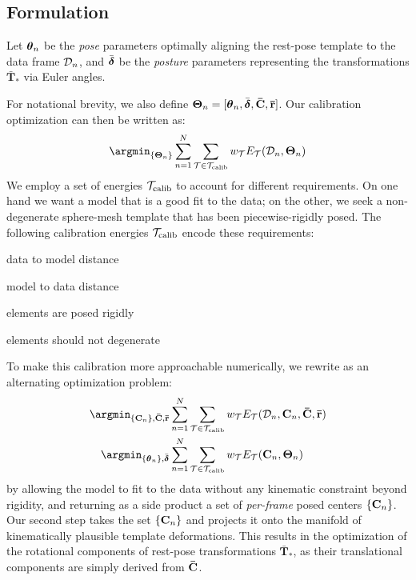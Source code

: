 


\subsection*{Formulation}
Let $\boldsymbol{\theta}_n$ be the \emph{pose} parameters optimally aligning the rest-pose template to the data frame $\mathcal{D}_n$, and $\bar{\boldsymbol{\delta}}$ be the \emph{posture} parameters representing the transformations $\mathbf{\bar{T}}_*$ via Euler angles. 

For notational brevity, we also define $\boldsymbol{\Theta}_n=[\boldsymbol{\theta}_n, \bar{\boldsymbol{\delta}}, {\mathbf{\bar{C}}}, {\mathbf{\bar{r}}}]$. Our calibration optimization can then be written as:
% 
\begin{eqnarray}
\argmin_{\{\parsHmodel_n\}}
\sum_{n=1}^N 
\sum_{\mathcal{T} \in \termscalib} 
w_\mathcal{T} E_\mathcal{T}(\depth_n, \parsHmodel_n)
\label{eq:calibration}
\end{eqnarray}
% 
We employ a set of energies ${\mathcal{T}_\text{calib}}$ to account for different requirements. On one hand we want a model that is a good fit to the data; on the other, we seek a non-degenerate sphere-mesh template that has been piecewise-rigidly posed. The following calibration energies ${\mathcal{T}_\text{calib}}$ encode these requirements:
% 
\begin{description}[labelsep=0em,labelwidth=.4in,labelindent=1cm,itemsep=-.6em]
\item[d2m] data to model distance
\item[m2d] model to data distance
\item[rigid] elements are posed rigidly
\item[valid] elements should not degenerate
\end{description}
% 
To make this calibration more approachable numerically, we rewrite  as an alternating optimization problem:
% 
\begin{eqnarray}
\argmin_{\posedcenters, \restcenters, \radii} &
\sum_{n=1}^N 
\sum_{\mathcal{T} \in \termscalib}
w_\mathcal{T} E_\mathcal{T}(\depth_n, \centers_n, \restcenters, \radii)
\label{eq:step1}
\\
\argmin_{\parposes,\parposture} &
\sum_{n=1}^N 
\sum_{\mathcal{T} \in \termscalib}
w_\mathcal{T} E_\mathcal{T}(\centers_n, \parsHmodel_n) 
\end{eqnarray}
% 
 by allowing the model to fit to the data without any kinematic constraint beyond rigidity, and returning as a side product a set of \emph{per-frame} posed centers ${\{\mathbf{C}_n\}}$. 
Our second step takes the set ${\{\mathbf{C}_n\}}$ and projects it onto the manifold of kinematically plausible template deformations. 
This results in the optimization of the rotational components of rest-pose transformations $\mathbf{\bar{T}}_*$, as their translational components are simply derived from ${\mathbf{\bar{C}}}$.

